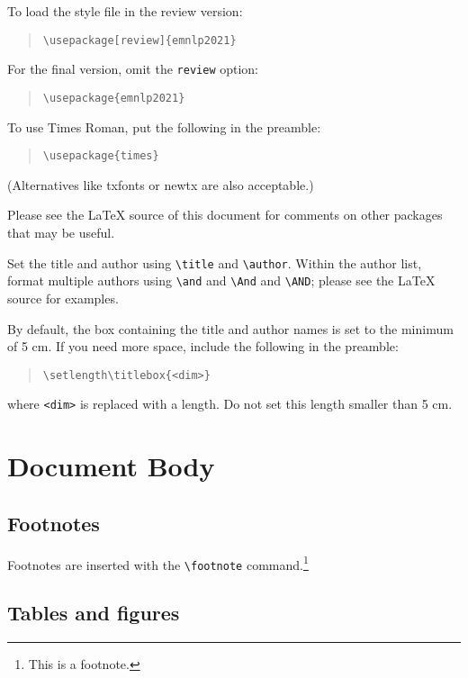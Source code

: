 \documentclass[11pt]{article}
\begin{document}
To load the style file in the review version:
\begin{quote}
\begin{verbatim}
\usepackage[review]{emnlp2021}
\end{verbatim}
\end{quote}
For the final version, omit the \verb|review| option:
\begin{quote}
\begin{verbatim}
\usepackage{emnlp2021}
\end{verbatim}
\end{quote}

To use Times Roman, put the following in the preamble:
\begin{quote}
\begin{verbatim}
\usepackage{times}
\end{verbatim}
\end{quote}
(Alternatives like txfonts or newtx are also acceptable.)

Please see the \LaTeX{} source of this document for comments on other packages that may be useful.

Set the title and author using \verb|\title| and \verb|\author|. Within the author list, format multiple authors using \verb|\and| and \verb|\And| and \verb|\AND|; please see the \LaTeX{} source for examples.

By default, the box containing the title and author names is set to the minimum of 5 cm. If you need more space, include the following in the preamble:
\begin{quote}
\begin{verbatim}
\setlength\titlebox{<dim>}
\end{verbatim}
\end{quote}
where \verb|<dim>| is replaced with a length. Do not set this length smaller than 5 cm.

\section{Document Body}

\subsection{Footnotes}

Footnotes are inserted with the \verb|\footnote| command.\footnote{This is a footnote.}

\subsection{Tables and figures}
\end{document}
